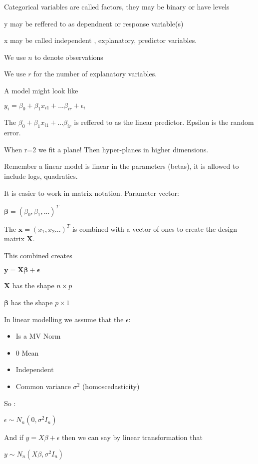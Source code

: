 \documentclass[
  letterpaper,
  DIV=11,
  numbers=noendperiod]{scrreprt}
\providecommand{\tightlist}{%
  \setlength{\itemsep}{0pt}\setlength{\parskip}{0pt}}\usepackage{longtable,booktabs,array}
\begin{document}
Categorical variables are called factors, they may be binary or have
levels

y may be reffered to as dependnent or response variable(s)

x may be called independent , explanatory, predictor variables.

We use \(n\) to denote observations

We use \(r\) for the number of explanatory variables.

A model might look like

\(y_i = \beta_0 + \beta_1x_{i1} + ... \beta_{ir} + \epsilon_i\)

The \(\beta_0 + \beta_1x_{i1} + ... \beta_{ir}\) is reffered to as the
linear predictor. Epsilon is the random error.

When r=2 we fit a plane! Then hyper-planes in higher dimensions.

Remember a linear model is linear in the parameters (betas), it is
allowed to include logs, quadratics.

It is easier to work in matrix notation. Parameter vector:

\(\boldsymbol{\beta} = (\beta_0, \beta_1, ...)^T\)

The \(\boldsymbol{x} = (x_1, x_2...)^T\) is combined with a vector of
ones to create the design matrix \(\boldsymbol{X}\).

This combined creates

\(\boldsymbol{y} = \boldsymbol{X} \boldsymbol{\beta}+ \boldsymbol{\epsilon}\)

\(\boldsymbol{X}\) has the shape \(n \times p\)

\(\boldsymbol{\beta}\) has the shape \(p \times 1\)

In linear modelling we assume that the \(\epsilon\):

\begin{itemize}
\tightlist
\item
  Is a MV Norm
\item
  0 Mean
\item
  Independent
\item
  Common variance \(\sigma^2\) (homoscedasticity)
\end{itemize}

So :

\(\epsilon \sim N_n(0, \sigma^2 I_n)\)

And if \(y = X\beta + \epsilon\) then we can say by linear
transformation that

\(y \sim N_n(X\beta, \sigma^2 I_n)\)
\end{document}
